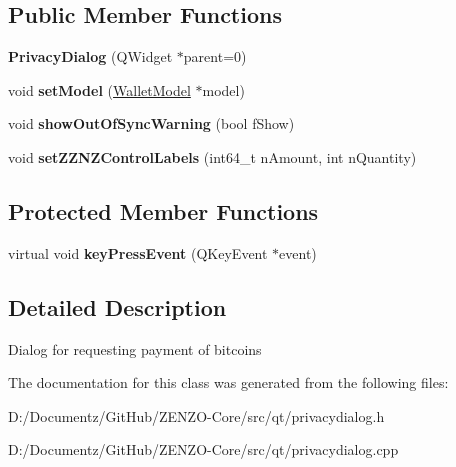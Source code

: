 \subsection*{Public Member Functions}
\begin{DoxyCompactItemize}
\item 
\mbox{\label{class_privacy_dialog_ab7308b7ed5782dfa26fb1f216385207c}} 
{\bfseries Privacy\+Dialog} (Q\+Widget $\ast$parent=0)
\item 
\mbox{\label{class_privacy_dialog_a7a2e2a84934e59ff1ff88de325036472}} 
void {\bfseries set\+Model} (\mbox{\hyperlink{class_wallet_model}{Wallet\+Model}} $\ast$model)
\item 
\mbox{\label{class_privacy_dialog_ace0f9c4b228a1d7915582884c7e403b0}} 
void {\bfseries show\+Out\+Of\+Sync\+Warning} (bool f\+Show)
\item 
\mbox{\label{class_privacy_dialog_a00ae3c0bead252ac3c3d681960a418ac}} 
void {\bfseries set\+Z\+Z\+N\+Z\+Control\+Labels} (int64\+\_\+t n\+Amount, int n\+Quantity)
\end{DoxyCompactItemize}
\subsection*{Protected Member Functions}
\begin{DoxyCompactItemize}
\item 
\mbox{\label{class_privacy_dialog_a4e014cfd8f1632ce00914b84e133cf64}} 
virtual void {\bfseries key\+Press\+Event} (Q\+Key\+Event $\ast$event)
\end{DoxyCompactItemize}


\subsection{Detailed Description}
Dialog for requesting payment of bitcoins 

The documentation for this class was generated from the following files\+:\begin{DoxyCompactItemize}
\item 
D\+:/\+Documentz/\+Git\+Hub/\+Z\+E\+N\+Z\+O-\/\+Core/src/qt/privacydialog.\+h\item 
D\+:/\+Documentz/\+Git\+Hub/\+Z\+E\+N\+Z\+O-\/\+Core/src/qt/privacydialog.\+cpp\end{DoxyCompactItemize}
